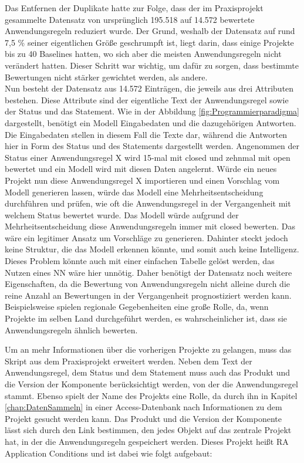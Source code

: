 Das Entfernen der Duplikate hatte zur Folge, dass der im Praxisprojekt gesammelte Datensatz von ursprünglich 195.518 auf 14.572 bewertete Anwendungsregeln reduziert wurde.
Der Grund, weshalb der Datensatz auf rund 7,5 \% seiner eigentlichen Größe geschrumpft ist, liegt darin, dass einige Projekte bis zu 40 Baselines hatten, 
wo sich aber die meisten Anwendungsregeln nicht verändert hatten. Dieser Schritt war wichtig, um dafür zu sorgen, dass bestimmte Bewertungen nicht stärker gewichtet werden,
als andere. \\

Nun besteht der Datensatz aus 14.572 Einträgen, die jeweils aus drei Attributen bestehen. Diese Attribute sind der eigentliche Text der Anwendungsregel sowie der Status und das Statement.
Wie in der Abbildung \ref{fig:Programmierparadigma} dargestellt, benötigt ein Modell Eingabedaten und die dazugehörigen Antworten. Die Eingabedaten stellen in diesem Fall
die Texte dar, während die Antworten hier in Form des Status und des Statements dargestellt werden. Angenommen der Status einer Anwendungsregel X wird 15-mal mit closed
und zehnmal mit open bewertet und ein Modell wird mit diesen Daten angelernt. Würde ein neues Projekt nun diese Anwendungsregel X importieren und einen Vorschlag vom Modell
generieren lassen, würde das Modell eine Mehrheitsentscheidung durchführen und prüfen, wie oft die Anwendungsregel in der Vergangenheit mit welchem Status bewertet wurde.
Das Modell würde aufgrund der Mehrheitsentscheidung diese Anwendungsregeln immer mit closed bewerten. Das wäre ein legitimer Ansatz um Vorschläge zu generieren. 
Dahinter steckt jedoch keine Struktur, die das Modell erkennen könnte, und somit auch keine Intelligenz. Dieses Problem könnte auch mit einer einfachen Tabelle 
gelöst werden, das Nutzen eines \ac{NN} wäre hier unnötig. Daher benötigt der Datensatz noch weitere Eigenschaften, da die Bewertung von Anwendungsregeln nicht alleine durch die 
reine Anzahl an Bewertungen in der Vergangenheit prognostiziert werden kann. Beispielsweise spielen regionale Gegebenheiten eine große Rolle, 
da, wenn Projekte im selben Land durchgeführt werden, es wahrscheinlicher ist, dass sie Anwendungsregeln ähnlich bewerten. 

Um an mehr Informationen über die vorherigen Projekte zu gelangen, muss das Skript aus dem Praxisprojekt erweitert werden. Neben dem Text der Anwendungsregel, dem Status und dem Statement
muss auch das Produkt und die Version der Komponente berücksichtigt werden, von der die Anwendungsregel stammt. Ebenso spielt der Name des Projekts eine Rolle,
da durch ihn in Kapitel \ref*{chap:DatenSammeln} in einer Access-Datenbank nach Informationen zu dem Projekt gesucht werden kann. 
Das Produkt und die Version der Komponente lässt sich durch den Link bestimmen, den jedes Objekt auf das zentrale Projekt hat, in der die Anwendungsregeln gespeichert werden.
Dieses Projekt heißt RA Application Conditions und ist dabei wie folgt aufgebaut:

